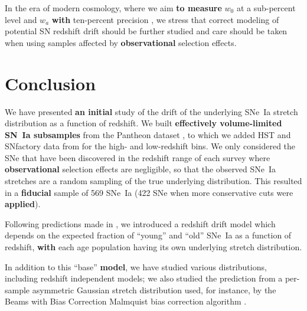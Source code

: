 \documentclass[]{aa}
\begin{document}
In the era of modern cosmology, where we aim \textbf{to measure} $w_0$ at a
sub-percent level and $w_a$ \textbf{with} ten-percent precision
\citep[e.g.,][]{lsstpaper}, we stress that correct modeling of potential SN
redshift drift should be further studied and care should be taken when using
samples affected by \textbf{observational} selection effects.

\section{Conclusion}\label{sec:ccl}

We have presented \textbf{an initial} study of the drift of the underlying
SNe~Ia stretch distribution as a function of redshift. We built
\textbf{effectively volume-limited SN~Ia subsamples} from the Pantheon dataset
\citep[][SDSS, PS1 and SNLS]{scolnic2018a}, to which we added HST and SNfactory
data from \cite{rigault2020} for the high- and low-redshift bins. We only
considered the SNe that have been discovered in the redshift range of each
survey where \textbf{observational} selection effects are negligible, so that
the observed SNe~Ia stretches are a random sampling of the true underlying
distribution. This resulted in a \textbf{fiducial} sample of 569 SNe~Ia (422 SNe
when more conservative cuts were \textbf{applied}).

Following predictions made in \cite{rigault2020}, we introduced a redshift drift
model which depends on the expected fraction of ``young'' and ``old'' SNe~Ia as
a function of redshift, \textbf{with} each age population having its own
underlying stretch distribution.

In addition to this ``base'' \textbf{model}, we have studied various
distributions, including redshift independent models; we also studied the
prediction from a per-sample asymmetric Gaussian stretch distribution used, for
instance, by the Beams with Bias Correction Malmquist bias correction algorithm
\citep{scolnic2016, kessler2017}.
\end{document}

